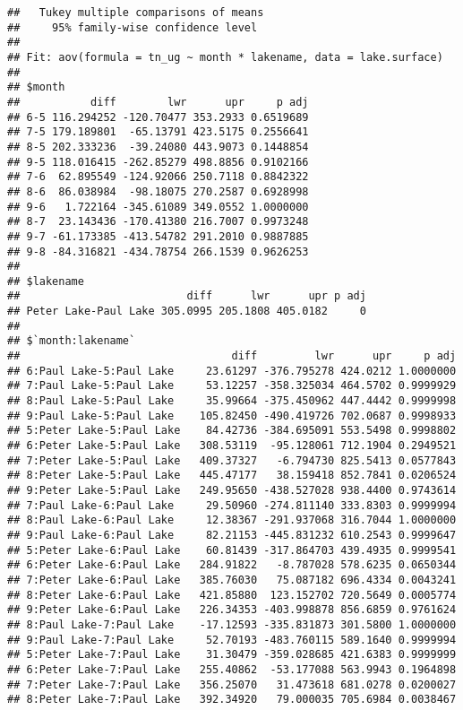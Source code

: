 \documentclass[]{article}
\begin{document}
\begin{verbatim}
##   Tukey multiple comparisons of means
##     95% family-wise confidence level
## 
## Fit: aov(formula = tn_ug ~ month * lakename, data = lake.surface)
## 
## $month
##           diff        lwr      upr     p adj
## 6-5 116.294252 -120.70477 353.2933 0.6519689
## 7-5 179.189801  -65.13791 423.5175 0.2556641
## 8-5 202.333236  -39.24080 443.9073 0.1448854
## 9-5 118.016415 -262.85279 498.8856 0.9102166
## 7-6  62.895549 -124.92066 250.7118 0.8842322
## 8-6  86.038984  -98.18075 270.2587 0.6928998
## 9-6   1.722164 -345.61089 349.0552 1.0000000
## 8-7  23.143436 -170.41380 216.7007 0.9973248
## 9-7 -61.173385 -413.54782 291.2010 0.9887885
## 9-8 -84.316821 -434.78754 266.1539 0.9626253
## 
## $lakename
##                          diff      lwr      upr p adj
## Peter Lake-Paul Lake 305.0995 205.1808 405.0182     0
## 
## $`month:lakename`
##                                 diff         lwr      upr     p adj
## 6:Paul Lake-5:Paul Lake     23.61297 -376.795278 424.0212 1.0000000
## 7:Paul Lake-5:Paul Lake     53.12257 -358.325034 464.5702 0.9999929
## 8:Paul Lake-5:Paul Lake     35.99664 -375.450962 447.4442 0.9999998
## 9:Paul Lake-5:Paul Lake    105.82450 -490.419726 702.0687 0.9998933
## 5:Peter Lake-5:Paul Lake    84.42736 -384.695091 553.5498 0.9998802
## 6:Peter Lake-5:Paul Lake   308.53119  -95.128061 712.1904 0.2949521
## 7:Peter Lake-5:Paul Lake   409.37327   -6.794730 825.5413 0.0577843
## 8:Peter Lake-5:Paul Lake   445.47177   38.159418 852.7841 0.0206524
## 9:Peter Lake-5:Paul Lake   249.95650 -438.527028 938.4400 0.9743614
## 7:Paul Lake-6:Paul Lake     29.50960 -274.811140 333.8303 0.9999994
## 8:Paul Lake-6:Paul Lake     12.38367 -291.937068 316.7044 1.0000000
## 9:Paul Lake-6:Paul Lake     82.21153 -445.831232 610.2543 0.9999647
## 5:Peter Lake-6:Paul Lake    60.81439 -317.864703 439.4935 0.9999541
## 6:Peter Lake-6:Paul Lake   284.91822   -8.787028 578.6235 0.0650344
## 7:Peter Lake-6:Paul Lake   385.76030   75.087182 696.4334 0.0043241
## 8:Peter Lake-6:Paul Lake   421.85880  123.152702 720.5649 0.0005774
## 9:Peter Lake-6:Paul Lake   226.34353 -403.998878 856.6859 0.9761624
## 8:Paul Lake-7:Paul Lake    -17.12593 -335.831873 301.5800 1.0000000
## 9:Paul Lake-7:Paul Lake     52.70193 -483.760115 589.1640 0.9999994
## 5:Peter Lake-7:Paul Lake    31.30479 -359.028685 421.6383 0.9999999
## 6:Peter Lake-7:Paul Lake   255.40862  -53.177088 563.9943 0.1964898
## 7:Peter Lake-7:Paul Lake   356.25070   31.473618 681.0278 0.0200027
## 8:Peter Lake-7:Paul Lake   392.34920   79.000035 705.6984 0.0038467

\end{verbatim}
\end{document}
